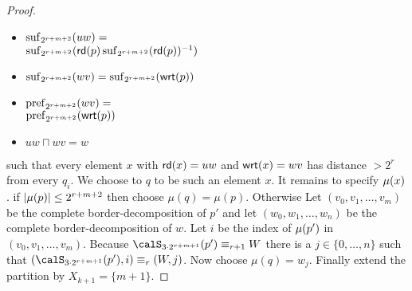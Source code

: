\begin{proof}
	\begin{minipage}{0.6\linewidth}
	\begin{itemize}
		\item $\operatorname{suf}_{2^{r+m+2}}(uw) =$ \\$\operatorname{suf}_{2^{r+m+2}}(\mathsf{rd}(p)\operatorname{suf}_{2^{r+m+2}}(\mathsf{rd}(p))^{-1} )$
		\item $\operatorname{suf}_{2^{r+m+2}}(wv) = \operatorname{suf}_{2^{r+m+2}}(\mathsf{wrt}(p))$
	\end{itemize}
    \end{minipage}
    \begin{minipage}{0.4\linewidth}
    	\begin{itemize}
    		\item $\operatorname{pref}_{2^{r+m+2}}(wv) =$\\ $\operatorname{pref}_{2^{r+m+2}}(\mathsf{wrt}(p))$
    		\item $uw\sqcap wv = w$
    	\end{itemize}
    \end{minipage}
    such that every element $x$ with $\mathsf{rd}(x) = uw$ and $\mathsf{wrt}(x) = wv$ has distance $> 2^r$ from every $q_i$.
    We choose to $q$ to be such an element $x$. It remains to specify $\mu(x)$. if $|\mu(p)| \leq 2^{r+m+2}$ then choose $\mu(q) = \mu(p)$. Otherwise
	Let $(v_0,v_1,\ldots, v_m)$ be the complete border-decomposition of $p'$ and let $(w_0, w_1,\ldots, w_n)$ be the complete border-decomposition of $w$. Let $i$
	be the index of $\mu(p')$ in $(v_0,v_1,\ldots, v_m)$. Because $\calS_{3\cdot 2^{r+m+1}}(p') \equiv_{r+1} W$ there is a $j\in \{0,\ldots,n\}$ such that $(\calS_{3\cdot 2^{r+m+1}}(p'), i) \equiv_r (W,j)$.
	Now choose $\mu(q) = w_j$. Finally extend the partition by $X_{k+1} = \{m+1\}$.
	
	

\end{proof}

